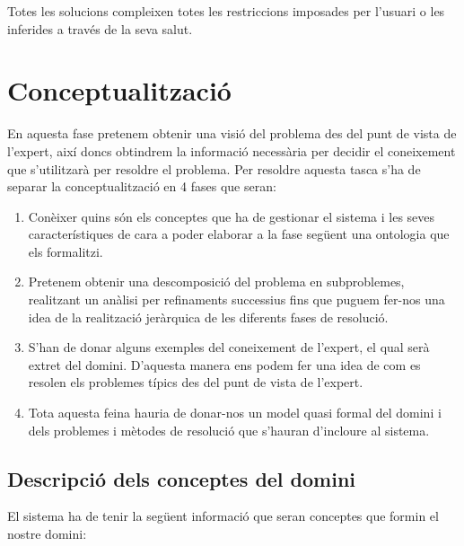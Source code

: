 \documentclass[a4paper, 12pt, UTF8]{article}
\begin{document}
Totes les solucions compleixen totes les restriccions imposades per l'usuari o les inferides a través de la seva salut.

\section{Conceptualització}
\label{sec:conceptualization}

En aquesta fase pretenem obtenir una visió del problema des del punt de vista de l'expert, així doncs obtindrem la informació necessària per decidir el coneixement que s'utilitzarà per resoldre el problema. Per resoldre aquesta tasca s'ha de separar la conceptualització en 4 fases que seran:

\begin{enumerate}
	\item Conèixer quins són els conceptes que ha de gestionar el sistema i les seves característiques de cara a poder elaborar a la fase següent una ontologia que els formalitzi.
	\item Pretenem obtenir una descomposició del problema en subproblemes, realitzant un anàlisi per refinaments successius fins que puguem fer-nos una idea de la realització jeràrquica de les diferents fases de resolució.
	\item S'han de donar alguns exemples del coneixement de l'expert, el qual serà extret del domini. D'aquesta manera ens podem fer una idea de com es resolen els problemes típics des del punt de vista de l'expert.
	\item Tota aquesta feina hauria de donar-nos un model quasi formal del domini i dels problemes i mètodes de resolució que s'hauran d'incloure al sistema.
\end{enumerate}

\subsection{Descripció dels conceptes del domini} 

El sistema ha de tenir la següent informació que seran conceptes que formin el nostre domini:
\end{document}
